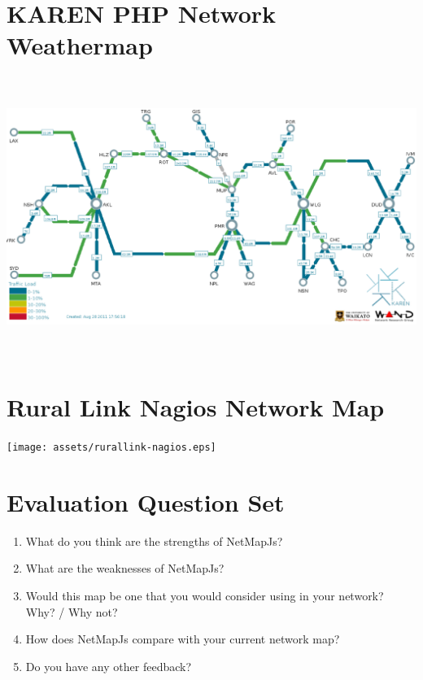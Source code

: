 \documentclass[11pt, a4paper]{report}
\begin{document}
\chapter{KAREN PHP Network Weathermap}
\label{app:karenphp}
\centering
\includegraphics[width=170mm,height=90.76mm]{assets/karen-phpweathermap.eps}


\chapter{Rural Link Nagios Network Map}
\label{app:crcnetnagios}
\centering
\texttt{[image: assets/rurallink-nagios.eps]}


\chapter{Evaluation Question Set}
\label{app:evaluation-questions}

\begin{enumerate}
\item What do you think are the strengths of NetMapJs?
\item What are the weaknesses of NetMapJs?
\item Would this map be one that you would consider using in your network? Why? / Why not?
\item How does NetMapJs compare with your current network map?
\item Do you have any other feedback?
\end{enumerate}
\end{document}
